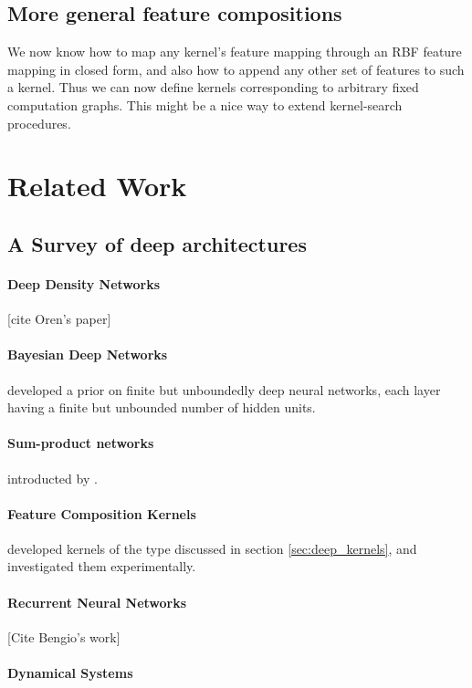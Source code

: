 \documentclass{article}
\begin{document}
\subsection{More general feature compositions}

We now know how to map any kernel's feature mapping through an RBF feature mapping in closed form, and also how to append any other set of features to such a kernel.  Thus we can now define kernels corresponding to arbitrary fixed computation graphs.  This might be a nice way to extend kernel-search procedures.


\section{Related Work}

\subsection{A Survey of deep architectures}

\paragraph{Deep Density Networks} 
[cite Oren's paper]

\paragraph{Bayesian Deep Networks} \cite{adams2010learning} developed a prior on finite but unboundedly deep neural networks, each layer having a finite but unbounded number of hidden units.
\paragraph{Sum-product networks} introducted by \cite{poon2011sum}.

\paragraph{Feature Composition Kernels} \cite{cho2012kernel} developed kernels of the type discussed in section \ref{sec:deep_kernels}, and investigated them experimentally.

\paragraph{Recurrent Neural Networks}
[Cite Bengio's work]


\paragraph{Dynamical Systems}
\end{document}
